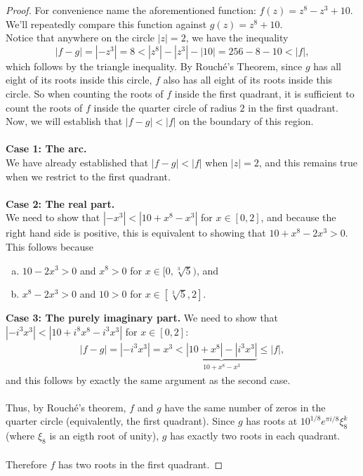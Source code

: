 \documentclass{article}
\begin{document}
\begin{proof}
  For convenience name the aforementioned function: $f(z) = z^8 - z^3 + 10$.
  We'll repeatedly compare this function against $g(z) = z^8 + 10$.
  \\
  Notice that anywhere on the circle $|z| = 2$, we have the inequality \[
    |f-g| = |-z^3| = 8 < |z^8| - |z^3| - |10| = 256-8-10 < |f|,
  \] which follows by the triangle inequality.
  By Rouch\'e's Theorem, since $g$ has all eight of its roots inside this
  circle, $f$ also has all eight of its roots inside this circle.
  So when counting the roots of $f$ inside the first quadrant, it is sufficient
  to count the roots of $f$ inside the quarter circle of radius $2$ in the first
  quadrant.
  Now, we will establish that $|f-g| < |f|$ on the boundary of this region.
  \\~\\
  \textbf{Case 1: The arc.}\\
  We have already established that $|f-g| < |f|$ when $|z| = 2$, and this
  remains true when we restrict to the first quadrant.
  \\~\\
  \textbf{Case 2: The real part.}\\
  We need to show that $|-x^3| < |10 + x^8 - x^3|$ for $x \in [0, 2]$, and
  because the right hand side is positive, this is equivalent to showing that
  $10 + x^8 - 2x^3 > 0$.
  This follows because \begin{enumerate}[(a)]
    \item $10 - 2x^3 > 0$ and $x^8 > 0$ for $x \in [0, \sqrt[3]5)$, and
    \item $x^8 - 2x^3 > 0$ and $10 > 0$ for $x \in [\sqrt[3]5, 2]$.
  \end{enumerate}
  \textbf{Case 3: The purely imaginary part.}
  We need to show that $|-i^3x^3| < |10 + i^8x^8 - i^3x^3|$ for $x \in [0, 2]$:
  \begin{align*}
    |f-g| = |-i^3x^3| = x^3 < \underbrace{|10 + x^8| - |i^3x^3|}_{10 + x^8 - x^3} \leq |f|,
  \end{align*} and this follows by exactly the same argument as the second case.
  \\~\\
  Thus, by Rouch\'e's theorem, $f$ and $g$ have the same number of zeros in the
  quarter circle (equivalently, the first quadrant). Since $g$ has roots at
  $10^{1/8}e^{\pi i/8}\xi^k_8$ (where $\xi_8$ is an eigth root of unity), $g$
  has exactly two roots in each quadrant.
  \\~\\
  Therefore $f$ has two roots in the first quadrant.
\end{proof}
\end{document}
